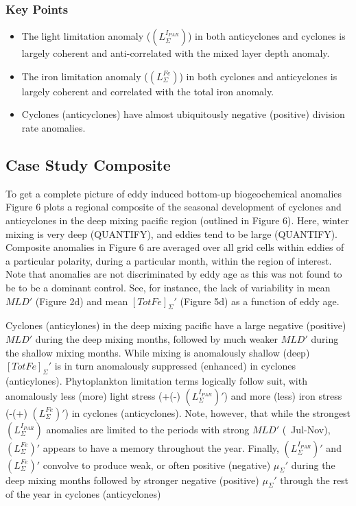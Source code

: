 

\vspace{3mm}
\subsubsection*{Key Points}
\begin{itemize}
\item The light limitation anomaly ($(L_\Sigma^{I_{PAR}})$) in both anticyclones and cyclones is largely coherent and anti-correlated with the mixed layer depth anomaly. 
\item The iron limitation anomaly ($(L_\Sigma^{Fe})$) in both cyclones and anticyclones is largely coherent and correlated with the total iron anomaly.
\item  Cyclones (anticyclones) have almost ubiquitously negative (positive) division rate anomalies. 
\end{itemize}
%


\subsection{Case Study Composite }

To get a complete picture of eddy induced bottom-up biogeochemical anomalies Figure 6 plots a regional composite of the seasonal development of cyclones and anticyclones in the deep mixing pacific region (outlined in Figure 6). Here, winter mixing is very deep (QUANTIFY), and eddies tend to be large (QUANTIFY). Composite anomalies in Figure 6 are averaged over all grid cells within eddies of a particular polarity, during a particular month, within the region of interest. Note that anomalies are not discriminated by eddy age as this was not found to be to be a dominant control. See, for instance, the lack of variability in  mean $MLD'$ (Figure 2d) and mean $[TotFe]_\Sigma'$ (Figure 5d) as a function of eddy age.

Cyclones (anticylones) in the deep mixing pacific have a large negative (positive) $MLD'$ during the deep mixing months, followed by much weaker $MLD'$ during the shallow mixing months. While mixing is anomalously shallow (deep) $[TotFe]_\Sigma'$ is in turn anomalously suppressed (enhanced) in cyclones (anticylones). Phytoplankton limitation terms logically follow suit, with anomalously less (more) light stress (+(-) $(L_\Sigma^{I_{PAR}})'$) and more (less) iron stress (-(+) $(L_\Sigma^{Fe})'$) in cyclones (anticyclones). Note, however, that while the strongest $(L_\Sigma^{I_{PAR}})$ anomalies are limited to the periods with strong $MLD'$ (~Jul-Nov), $(L_\Sigma^{Fe})'$ appears to have a memory throughout the year. Finally, $(L_\Sigma^{I_{PAR}})'$ and $(L_\Sigma^{Fe})'$ convolve to produce weak, or often positive (negative) $\mu_\Sigma'$ during the deep mixing months followed by stronger negative (positive) $\mu_\Sigma'$ through the rest of the year in cyclones (anticyclones) 

